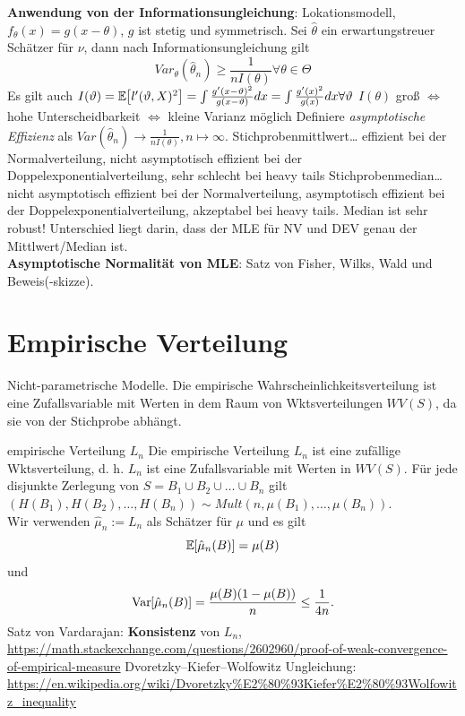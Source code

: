 \begin{outline}
\0 \textbf{Anwendung von der Informationsungleichung}: Lokationsmodell, $f_\theta(x)=g(x-\theta)$, $g$ ist stetig und symmetrisch. Sei $\hat{\theta}$ ein erwartungstreuer Schätzer für $\nu$, dann nach Informationsungleichung gilt 
$$Var_\theta(\hat{\theta}_n) \geq \frac{1}{nI(\theta)} \forall \theta\in\Theta$$
Es gilt auch $I(\vartheta)=\mathbb{E}\hspace{-2pt}\left[{l'(\vartheta,X)^2}\right]=\int \frac{g'(x-\vartheta)^2}{g(x-\vartheta)}dx=\int\frac{g'(x)^2}{g(x)}dx \forall \vartheta$
    \1 $I(\theta)$ groß $\iff$ hohe Unterscheidbarkeit $\iff$ kleine Varianz möglich
\0 Definiere \emph{asymptotische Effizienz} als $Var(\hat{\theta}_n)\to \frac{1}{nI(\theta)}, n\mapsto \infty$.
    \1 Stichprobenmittlwert\ldots
        \2 effizient bei der Normalverteilung, nicht asymptotisch effizient bei der Doppelexponentialverteilung, sehr schlecht bei heavy tails
    \1 Stichprobenmedian\ldots
        \2 nicht asymptotisch effizient bei der Normalverteilung, asymptotisch effizient bei der Doppelexponentialverteilung, akzeptabel bei heavy tails. Median ist sehr robust!
\0 Unterschied liegt darin, dass der MLE für NV und DEV genau der Mittlwert/Median ist. \\
\0 \textbf{Asymptotische Normalität von MLE}: Satz von Fisher, Wilks, Wald und Beweis(-skizze).
\end{outline}

\newpage

\section{Empirische Verteilung}

Nicht-parametrische Modelle. Die empirische Wahrscheinlichkeitsverteilung ist eine Zufallsvariable mit Werten in dem Raum von Wktsverteilungen $WV(S)$, da sie von der Stichprobe abhängt.

\begin{outline}
    \1 empirische Verteilung $L_n$
\0 Die empirische Verteilung $L_n$ ist eine zufällige Wktsverteilung, d. h. $L_n$ ist eine Zufallsvariable mit Werten in $WV(S)$. Für jede disjunkte Zerlegung von $S= B_1\cup B_2 \cup \ldots \cup B_n$ gilt $(H(B_1),H(B_2),\ldots,H(B_n)) \sim Mult(n, \mu(B_1),\ldots, \mu(B_n))$.\\
\0 Wir verwenden $\hat{\mu}_n:=L_n$ als Schätzer für $\mu$ und es gilt $$\mathbb{E}\hspace{-2pt}\left[{\hat{\mu}_n(B)}\right]=\mu(B)$$ und $$\operatorname{Var}\hspace{-2pt}\left[{\hat{\mu}_n(B)}\right] = \frac{\mu(B)(1-\mu(B))}{n}\leq \frac{1}{4n}.$$
    \1 Satz von Vardarajan: \textbf{Konsistenz} von $L_n$, \url{https://math.stackexchange.com/questions/2602960/proof-of-weak-convergence-of-empirical-measure}
    \1 Dvoretzky–Kiefer–Wolfowitz Ungleichung: \url{https://en.wikipedia.org/wiki/Dvoretzky%E2%80%93Kiefer%E2%80%93Wolfowitz_inequality}
\end{outline}

